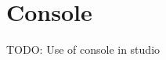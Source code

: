 \documentclass[../StudioOperationGuide.tex]{subfiles}
\begin{document}
\chapter{Console}
TODO: Use of console in studio

\lipsum[1-10]
\end{document}
